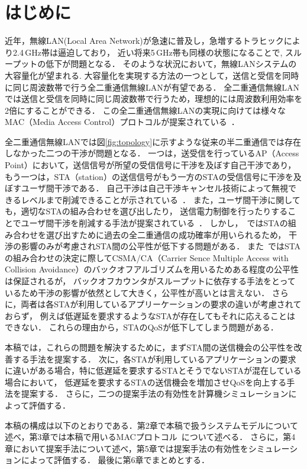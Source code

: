 \documentclass[technicalreport]{ieicej}
\begin{document}
\maketitle

\section{はじめに}
	近年，無線LAN(Local Area Network)が急速に普及し，急増するトラヒックにより2.4\,GHz帯は逼迫しており，
	近い将来5\,GHz帯も同様の状態になることで, スループットの低下が問題となる．
	そのような状況において，無線LANシステムの大容量化が望まれる.
	大容量化を実現する方法の一つとして，送信と受信を同時に同じ周波数帯で行う全二重通信無線LANが有望である．
	全二重通信無線LANでは送信と受信を同時に同じ周波数帯で行うため，理想的には周波数利用効率を2倍にすることができる．
	この全二重通信無線LANの実現に向けては様々なMAC（Media Access Control）プロトコルが提案されている~\cite{fdmac, goyal, janus, fdmac2, morif, fdmac3, fcts}．
	\par
	全二重通信無線LANでは図\ref{fig:topology}に示すような従来の半二重通信では存在しなかった二つの干渉が問題となる．
	一つは，送受信を行っているAP（Access Point）において，送信信号が所望の受信信号に干渉を及ぼす自己干渉であり，
	もう一つは，STA（station）の送信信号がもう一方のSTAの受信信号に干渉を及ぼすユーザ間干渉である．
	自己干渉は自己干渉キャンセル技術によって無視できるレベルまで削減できることが示されている~\cite{fdmac, stanford1}．
	また，ユーザ間干渉に関しても，適切なSTAの組み合わせを選び出したり，
	送信電力制御を行ったりすることでユーザ間干渉を削減する手法が提案されている~\cite{contra, promac}．
	しかし，~\cite{contra}ではSTAの組み合わせを選び出すために過去の全二重通信の成功確率が用いられるため，
	干渉の影響のみが考慮されSTA間の公平性が低下する問題がある．
	また~\cite{promac}ではSTAの組み合わせの決定に際してCSMA/CA（Carrier Sence Multiple Access with Collision Avoidance）のバックオフアルゴリズムを用いるためある程度の公平性は保証されるが，
	バックオフカウンタがスループットに依存する手法をとっているため干渉の影響が依然として大きく，公平性が高いとは言えない．
	さらに，両者は各STAが利用しているアプリーケーションの要求の違いが考慮されておらず，
	例えば低遅延を要求するようなSTAが存在してもそれに応えることはできない．
	これらの理由から，STAのQoSが低下してしまう問題がある．
	\par
	本稿では，これらの問題を解決するために，まずSTA間の送信機会の公平性を改善する手法を提案する．
	次に，各STAが利用しているアプリケーションの要求に違いがある場合，特に低遅延を要求するSTAとそうでないSTAが混在している場合において，
	低遅延を要求するSTAの送信機会を増加させQoSを向上する手法を提案する．
	さらに，二つの提案手法の有効性を計算機シミュレーションによって評価する．
	\par
	本稿の構成は以下のとおりである．第2章で本稿で扱うシステムモデルについて述べ，第3章では本稿で用いるMACプロトコル~\cite{promac}について述べる．
	さらに，第4章において提案手法について述べ，第5章では提案手法の有効性をシミュレーションによって評価する．
	最後に第6章でまとめとする．
\end{document}
